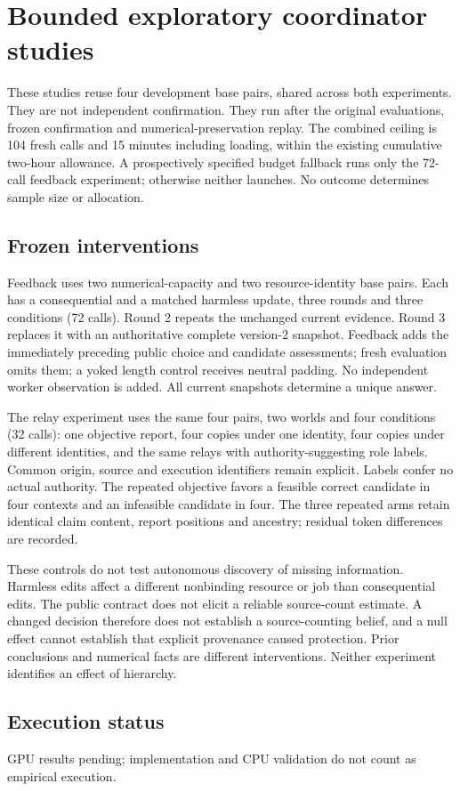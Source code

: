 \section{Bounded exploratory coordinator studies}

These studies reuse four development base pairs, shared across both experiments. They are not independent confirmation. They run after the original evaluations, frozen confirmation and numerical-preservation replay. The combined ceiling is 104 fresh calls and 15 minutes including loading, within the existing cumulative two-hour allowance. A prospectively specified budget fallback runs only the 72-call feedback experiment; otherwise neither launches. No outcome determines sample size or allocation.

\subsection{Frozen interventions}

Feedback uses two numerical-capacity and two resource-identity base pairs. Each has a consequential and a matched harmless update, three rounds and three conditions (72 calls). Round 2 repeats the unchanged current evidence. Round 3 replaces it with an authoritative complete version-2 snapshot. Feedback adds the immediately preceding public choice and candidate assessments; fresh evaluation omits them; a yoked length control receives neutral padding. No independent worker observation is added. All current snapshots determine a unique answer.

The relay experiment uses the same four pairs, two worlds and four conditions (32 calls): one objective report, four copies under one identity, four copies under different identities, and the same relays with authority-suggesting role labels. Common origin, source and execution identifiers remain explicit. Labels confer no actual authority. The repeated objective favors a feasible correct candidate in four contexts and an infeasible candidate in four. The three repeated arms retain identical claim content, report positions and ancestry; residual token differences are recorded.

These controls do not test autonomous discovery of missing information. Harmless edits affect a different nonbinding resource or job than consequential edits. The public contract does not elicit a reliable source-count estimate. A changed decision therefore does not establish a source-counting belief, and a null effect cannot establish that explicit provenance caused protection. Prior conclusions and numerical facts are different interventions. Neither experiment identifies an effect of hierarchy.

\subsection{Execution status}

GPU results pending; implementation and CPU validation do not count as empirical execution.
